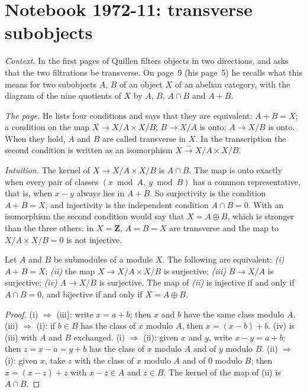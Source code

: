 \section[Notebook 1972-11: transverse subobjects]{Notebook 1972-11: transverse subobjects\protect{}}\label{sec:quillen-1972-11-transverse}

\emph{Context.} In the first pages of  Quillen filters objects in two directions, and asks that the two filtrations be transverse. On page~9 (his page~5) he recalls what this means for two subobjects $A$, $B$ of an object $X$ of an abelian category, with the diagram of the nine quotients of $X$ by $A$, $B$, $A \cap B$ and $A + B$.

\emph{The page.} He lists four conditions and says that they are equivalent: $A + B = X$; a condition on the map $X \to X/A \times X/B$; $B \to X/A$ is onto; $A \to X/B$ is onto. When they hold, $A$ and $B$ are called transverse in $X$. In the transcription the second condition is written as an isomorphism $X \xrightarrow{\sim} X/A \times X/B$.

\emph{Intuition.} The kernel of $X \to X/A \times X/B$ is $A \cap B$. The map is onto exactly when every pair of classes $(x \bmod A,\ y \bmod B)$ has a common representative, that is, when $x - y$ always lies in $A + B$. So surjectivity is the condition $A + B = X$, and injectivity is the independent condition $A \cap B = 0$. With an isomorphism the second condition would say that $X = A \oplus B$, which is stronger than the three others: in $X = \mathbf Z$, $A = B = X$ are transverse and the map to $X/A \times X/B = 0$ is not injective.

\begin{encadre}
\begin{theoreme}\label{thm:quillen-1972-11-transverse}
Let $A$ and $B$ be submodules of a module $X$. The following are equivalent: \emph{(i)} $A + B = X$; \emph{(ii)} the map $X \to X/A \times X/B$ is surjective; \emph{(iii)} $B \to X/A$ is surjective; \emph{(iv)} $A \to X/B$ is surjective. The map of \emph{(ii)} is injective if and only if $A \cap B = 0$, and bijective if and only if $X = A \oplus B$.
\end{theoreme}
\end{encadre}

\begin{proof}
(i) $\Rightarrow$ (iii): write $x = a + b$; then $x$ and $b$ have the same class modulo $A$. (iii) $\Rightarrow$ (i): if $b \in B$ has the class of $x$ modulo $A$, then $x = (x - b) + b$. (iv) is (iii) with $A$ and $B$ exchanged. (i) $\Rightarrow$ (ii): given $x$ and $y$, write $x - y = a + b$; then $z = x - a = y + b$ has the class of $x$ modulo $A$ and of $y$ modulo $B$. (ii) $\Rightarrow$ (i): given $x$, take $z$ with the class of $x$ modulo $A$ and of $0$ modulo $B$; then $x = (x - z) + z$ with $x - z \in A$ and $z \in B$. The kernel of the map of (ii) is $A \cap B$.
\end{proof}

